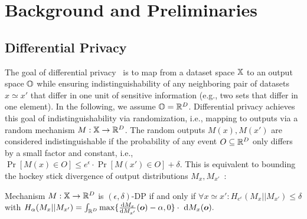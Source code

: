 \section{Background and Preliminaries}\label{section:background}
\subsection{Differential Privacy}
The goal of differential privacy~\cite{dwork2006differential} is to map from a dataset space ${\mathbb{X}}$ to an output space ${\mathbb{O}}$ while ensuring indistinguishability of any neighboring pair of datasets $x \simeq x'$ that differ in one unit of sensitive information (e.g., two sets that differ in one element).
In the following, we assume ${\mathbb{O}} = {\mathbb{R}}^D$.
Differential privacy achieves this goal of indistinguishability via randomization, i.e., mapping to outputs via a random mechanism $M : {\mathbb{X}} \rightarrow {\mathbb{R}}^D$.
The random outputs $M(x), M(x')$ are considered indistinguishable if the probability of any event $O \subseteq {\mathbb{R}}^D$ only differs by a small factor and constant, i.e., $\Pr[M(x) \in O] \leq e^\epsilon \cdot \Pr[M(x') \in O] + \delta$.
This is equivalent to bounding the hockey stick divergence of output distributions $M_x, M_{x'}$~\cite{barthe2013beyond}:
\begin{definition}
    Mechanism $M: {\mathbb{X}} \rightarrow {\mathbb{R}}^D$ is $(\epsilon,\delta)$-DP if and only if
    $\forall x \simeq x' :  H_{e^{\epsilon}}(M_x || M_{x'}) \leq \delta$ with 
    $
        H_{\alpha}(M_x || M_{x'}) = \int_{{\mathbb{R}}^D} \max\{ \frac{\mathrm{d} M_x}{\mathrm{d} M_{x'}}({\bm{o}}) - \alpha , 0\} \cdot  \ \mathrm{d} M_x({\bm{o}}).
    $
\end{definition}

